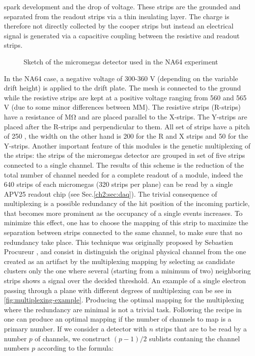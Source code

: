 spark development and the drop of voltage. These strips are the grounded and separated from the readout strips via a thin insulating layer. The charge is therefore not directly collected by the cooper strips but instead an electrical signal is generated via a capacitive coupling between the resistive and readout strips.

\begin{figure}[bth!]
  \centering
  
  \caption[Micromegas sketch]{Sketch of the micromegas detector used in the NA64 experiment}
  \label{fig:mm-sketch}
\end{figure}

In the NA64 case, a negative voltage of 300-360 \si{\volt} (depending on the variable drift height) is applied to the drift plate. The mesh is connected to the ground while the resistive strips are kept at a positive voltage ranging from 560 and 565 \si{\volt} (due to some minor differences between MM). The resistive strips (R-strips) have a resistance of \si{\mega\ohm} and are placed parallel to the X-strips. The Y-strips are placed after the R-strips and perpendicular to them. All set of strips have a pitch of 250 \mum, the width on the other hand is 200 \mum for the R and X strips and 50 \mum for the Y-strips.
Another important feature of this modules is the genetic multiplexing of the strips: the strips of the micromegas detector are grouped in set of five strips connected to a single channel. The results of this scheme is the reduction of the total number of channel needed for a complete readout of a module, indeed the 640 strips of each micromegas (320 strips per plane) can be read by a single APV25 readout chip (see Sec.\ref{ch2:sec:daq}). The trivial consequence of multiplexing is a possible redundancy of the hit position of the incoming particle, that becomes more prominent as the occupancy of a single events increases. To minimize this effect, one has to choose the mapping of this strip to maximize the separation between strips connected to the same channel, to make sure that no redundancy take place. This technique was originally proposed by Sebastien Procureur \cite{Procureur:2013yea}, and consist in distinguish the original physical channel from the one created as an artifact by the multiplexing mapping by selecting as candidate clusters only the one where several (starting from a minimum of two) neighboring strips shows a signal over the decided threshold. An example of a single electron passing through a plane with different degrees of multiplexing can be see in \ref{fig:multiplexing-example}. Producing the optimal mapping for the multiplexing where the redundancy are minimal is not a trivial task. Following the recipe in \cite{Procureur:2013yea} one can produce an optimal mapping if the number of channels to map is a primary number. If we consider a detector with $n$ strips that are to be read by a number $p$ of channels, we construct $(p-1)/2$ sublists contaning the channel numbers $p$ according to the formula:


